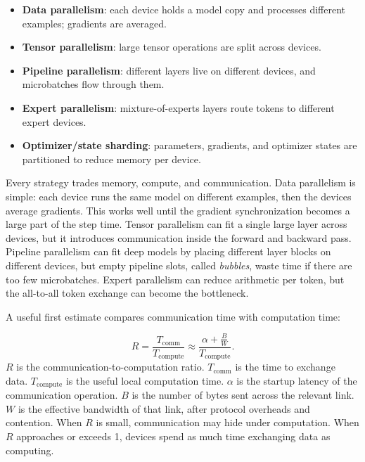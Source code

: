 \begin{itemize}[leftmargin=*]
  \item \textbf{Data parallelism}: each device holds a model copy and processes different examples; gradients are averaged.
  \item \textbf{Tensor parallelism}: large tensor operations are split across devices.
  \item \textbf{Pipeline parallelism}: different layers live on different devices, and microbatches flow through them.
  \item \textbf{Expert parallelism}: mixture-of-experts layers route tokens to different expert devices.
  \item \textbf{Optimizer/state sharding}: parameters, gradients, and optimizer states are partitioned to reduce memory per device.
\end{itemize}

Every strategy trades memory, compute, and communication. Data parallelism is simple: each device runs the same model on different examples, then the devices average gradients. This works well until the gradient synchronization becomes a large part of the step time. Tensor parallelism can fit a single large layer across devices, but it introduces communication inside the forward and backward pass. Pipeline parallelism can fit deep models by placing different layer blocks on different devices, but empty pipeline slots, called \emph{bubbles}, waste time if there are too few microbatches. Expert parallelism can reduce arithmetic per token, but the all-to-all token exchange can become the bottleneck.

A useful first estimate compares communication time with computation time:
\begin{keyequation}
\[
  R =
  \frac{T_{\text{comm}}}{T_{\text{compute}}}
  \approx
  \frac{\alpha + \frac{B}{W}}{T_{\text{compute}}}.
\]
\tcblower
\(R\) is the communication-to-computation ratio. \(T_{\text{comm}}\) is the time to exchange data. \(T_{\text{compute}}\) is the useful local computation time. \(\alpha\) is the startup latency of the communication operation. \(B\) is the number of bytes sent across the relevant link. \(W\) is the effective bandwidth of that link, after protocol overheads and contention. When \(R\) is small, communication may hide under computation. When \(R\) approaches or exceeds 1, devices spend as much time exchanging data as computing.
\end{keyequation}

